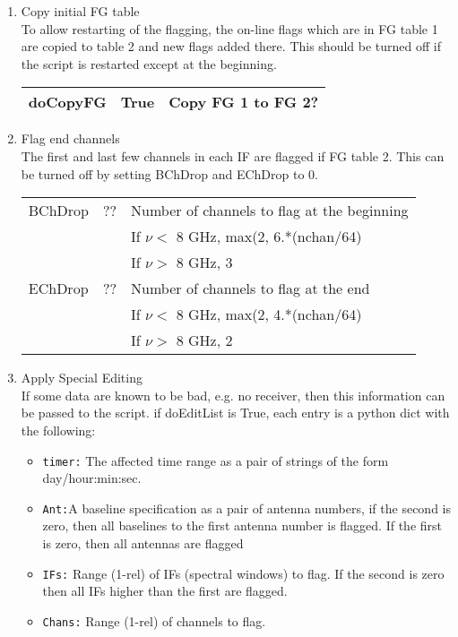 \documentclass[11pt]{article}
\begin{document}
\begin{enumerate}
\begin{center}
\end{center}
%
\item Copy initial FG table \\
To allow restarting of the flagging, the on-line flags which are in FG
table 1 are copied to table 2 and new flags added there.
This should be turned off if the script is restarted except at the beginning.
\begin{center}
\begin{tabular}{|l|c|l|}
\hline
doCopyFG  & True & Copy FG 1 to FG 2? \\
\hline
\end{tabular}
\end{center}
%
\item Flag end channels\\
The first and last few channels in each IF are flagged if FG table 2.
This can be turned off by setting BChDrop and EChDrop to 0.
\begin{center}
\begin{tabular}{|l|c|l|}
\hline
BChDrop  & ?? & Number of channels to flag at the beginning \\
 & & If $\nu<$ 8 GHz, max(2, 6.*(nchan/64)\\
 & & If $\nu>$ 8 GHz, 3\\
EChDrop  & ?? & Number of channels to flag at the end \\
 & & If $\nu<$ 8 GHz, max(2, 4.*(nchan/64)\\
 & & If $\nu>$ 8 GHz, 2\\
\hline
\end{tabular}
\end{center}
%
%
\item Apply Special Editing\\
If some data are known to be bad, e.g. no receiver, then this
information can be passed to the script.
if doEditList is True, each entry is a python dict with the following:
\begin{itemize}
\item{\tt timer:} The affected time range as a pair of strings of the
form day/hour:min:sec.
\item{\tt Ant:}A baseline specification as a pair of antenna numbers,
if the second is zero, then all baselines to the first antenna number
is flagged.  
If the first is zero, then all antennas are flagged
\item{\tt IFs:} Range (1-rel)  of IFs (spectral windows) to flag.
If the second is zero then all IFs higher than the first are flagged.
\item{\tt Chans:} Range (1-rel) of channels to flag.

\end{itemize}
\end{enumerate}
\end{document}
